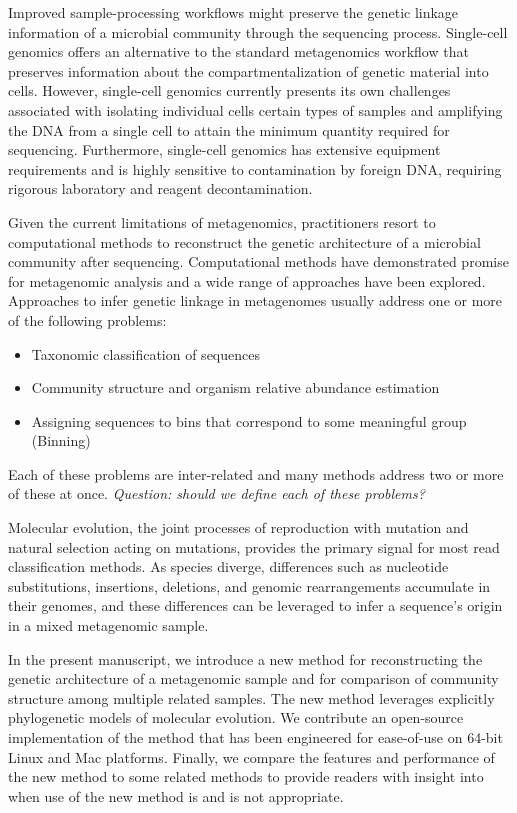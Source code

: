\documentclass[10pt]{article}
\begin{document}
Improved sample-processing workflows might preserve the genetic linkage information of a microbial community through the sequencing process.
Single-cell genomics offers an alternative to the standard metagenomics workflow that preserves information about the compartmentalization of genetic material into cells. 
However, single-cell genomics currently presents its own challenges associated with isolating individual cells certain types of samples and amplifying the {DNA} from a single cell to attain the minimum quantity required for sequencing. 
Furthermore, single-cell genomics has extensive equipment requirements and is highly sensitive to contamination by foreign DNA, requiring rigorous laboratory and reagent decontamination.

Given the current limitations of metagenomics, practitioners resort to computational methods to reconstruct the genetic architecture of a microbial community after sequencing.
Computational methods have demonstrated promise for metagenomic analysis and a wide range of approaches have been explored.
Approaches to infer genetic linkage in metagenomes usually address one or more of the following problems:
\begin{itemize}
\item Taxonomic classification of sequences
\item Community structure and organism relative abundance estimation
\item Assigning sequences to bins that correspond to some meaningful group (Binning)
\end{itemize}
Each of these problems are inter-related and many methods address two or more of these at once.
\textit{Question: should we define each of these problems?}

Molecular evolution, the joint processes of reproduction with mutation and natural selection acting on mutations, provides the primary signal for most read classification methods.
As species diverge, differences such as nucleotide substitutions, insertions, deletions, and genomic rearrangements accumulate in their genomes, and these differences can be leveraged to infer a sequence's origin in a mixed metagenomic sample.

In the present manuscript, we introduce a new method for reconstructing the genetic architecture of a metagenomic sample and for comparison of community structure among multiple related samples.
The new method leverages explicitly phylogenetic models of molecular evolution. 
We contribute an open-source implementation of the method that has been engineered for ease-of-use on 64-bit Linux and Mac platforms.
Finally, we compare the features and performance of the new method to some related methods to provide readers with insight into when use of the new method is and is not appropriate.
\end{document}
